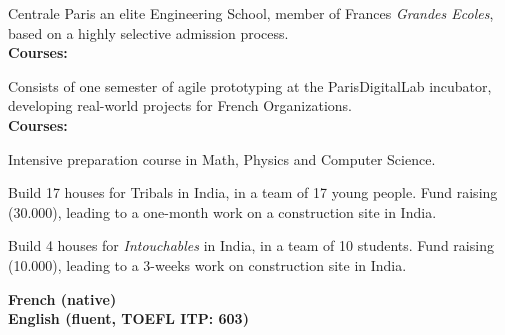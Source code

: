 



\small{Centrale Paris an elite Engineering School, member of France\textquotesingle s \emph{Grandes Ecoles}, based on a highly selective admission process.\\}
{\textbf{Courses:}} \footnotesize{    }

\divider

\small{Consists of one semester of agile prototyping at the ParisDigitalLab incubator, developing real-world projects for French Organizations.\\}%
{\textbf{Courses:}} \footnotesize{  }

\divider

\small{Intensive preparation course in Math, Physics and Computer Science.}

\divider





\small{Build 17 houses for Tribals in India, in a team of 17 young people.
Fund raising (30.000\texteuro), leading to a one-month work on a construction site in India.}

\divider


\small{Build 4 houses for \emph{Intouchables} in India, in a team of 10 students.
Fund raising (10.000\texteuro), leading to a 3-weeks work on construction site in India.}


{\textcolor{emphasis}{\textbf{French (native)\\English (fluent, TOEFL ITP: 603)}}}




